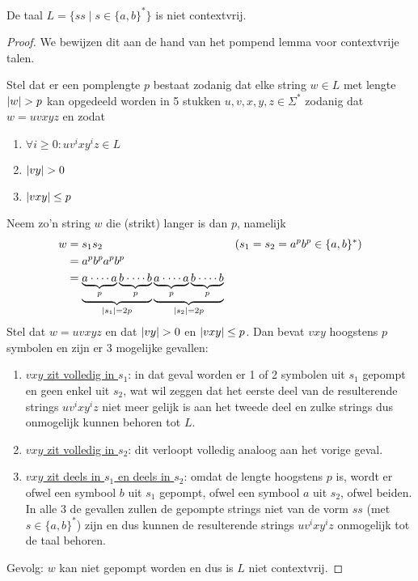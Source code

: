 \documentclass[../aanvullingen_cursus.tex]{subfiles}
\begin{document}
\begin{stelling}
	De taal \(L=\{ss \mid s\in \{a,b\}^*\}\) is niet contextvrij.
\end{stelling}


\begin{proof}
	We bewijzen dit aan de hand van het pompend lemma voor contextvrije talen.

	Stel dat er een pomplengte \(p\) bestaat zodanig dat elke string \(w \in L\) met lengte \(\lvert w \rvert>p\) kan opgedeeld worden in 5 stukken \(u,v,x,y,z \in \Sigma^*\) zodanig dat \(w=uvxyz\) en zodat\begin{enumerate}
		\item \(\forall i \geq 0 : uv^ixy^iz \in L \)
		\item \(\lvert vy \rvert>0\)
		\item \(\lvert vxy \rvert\leq p\)
	\end{enumerate}

	Neem zo'n string \(w\) die (strikt) langer is dan \(p\), namelijk \begin{align*}
		w &= s_1s_2 && (s_1=s_2=a^pb^p \in \{a,b\}^*) \\
			&= a^pb^pa^pb^p \\
			&= \underbrace{\underbrace{a\cdot\cdots a}_p\underbrace{b\cdot\cdots b}_p}_{\lvert s_1 \rvert=2p} \underbrace{\underbrace{a\cdot\cdots a}_p\underbrace{b\cdot\cdots b}_p}_{\lvert s_2 \rvert=2p}
	\end{align*}
	Stel dat \(w=uvxyz\) en dat \(\lvert vy \rvert>0\) en \(\lvert vxy \rvert\leq p\). Dan bevat \(vxy\) hoogstens \(p\) symbolen en zijn er 3 mogelijke gevallen: \begin{enumerate}
		\item \underline{\(vxy\) zit volledig in \(s_1\)}: in dat geval worden er 1 of 2 symbolen uit \(s_1\) gepompt en geen enkel uit \(s_2\), wat wil zeggen dat het eerste deel van de resulterende strings \(uv^ixy^iz\) niet meer gelijk is aan het tweede deel en zulke strings dus onmogelijk kunnen behoren tot \(L\).
		\item \underline{\(vxy\) zit volledig in \(s_2\)}: dit verloopt volledig analoog aan het vorige geval.
		\item \underline{\(vxy\) zit deels in \(s_1\) en deels in \(s_2\)}: omdat de lengte hoogstens \(p\) is, wordt er ofwel een symbool \(b\) uit \(s_1\) gepompt, ofwel een symbool \(a\) uit \(s_2\), ofwel beiden. In alle 3 de gevallen zullen de gepompte strings niet van de vorm \(ss\) (met \(s \in \{a,b\}^*\)) zijn en dus kunnen de resulterende strings \(uv^ixy^iz\) onmogelijk tot de taal behoren.
	\end{enumerate}
	Gevolg: \(w\) kan niet gepompt worden en dus is \(L\) niet contextvrij.
\end{proof}
\end{document}
